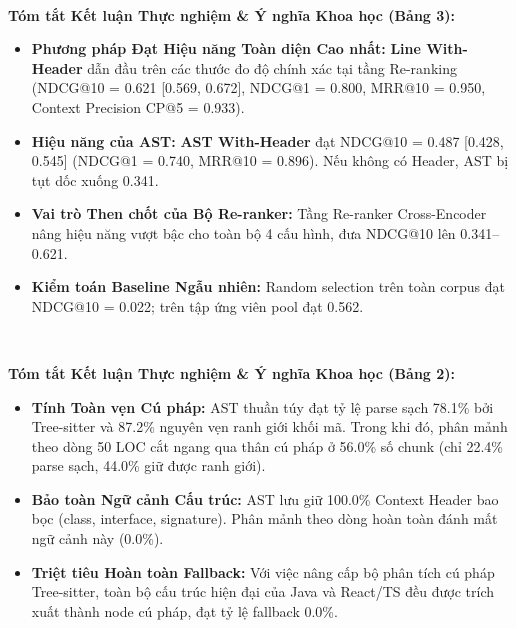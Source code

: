 \documentclass[11pt,a4paper,landscape]{article}
\begin{document}
\\[0.05cm]

\vspace{-0.1cm}
{\footnotesize
\noindent\textbf{Tóm tắt Kết luận Thực nghiệm \& Ý nghĩa Khoa học (Bảng 3):}
\begin{itemize}[nosep,topsep=1pt,partopsep=0pt,itemsep=1pt]
    \item \textbf{Phương pháp Đạt Hiệu năng Toàn diện Cao nhất:} \textbf{Line With-Header} dẫn đầu trên các thước đo độ chính xác tại tầng Re-ranking (NDCG@10 = 0.621 [0.569, 0.672], NDCG@1 = 0.800, MRR@10 = 0.950, Context Precision CP@5 = 0.933).
    \item \textbf{Hiệu năng của AST:} \textbf{AST With-Header} đạt NDCG@10 = 0.487 [0.428, 0.545] (NDCG@1 = 0.740, MRR@10 = 0.896). Nếu không có Header, AST bị tụt dốc xuống 0.341.
    \item \textbf{Vai trò Then chốt của Bộ Re-ranker:} Tầng Re-ranker Cross-Encoder nâng hiệu năng vượt bậc cho toàn bộ 4 cấu hình, đưa NDCG@10 lên 0.341--0.621.
    \item \textbf{Kiểm toán Baseline Ngẫu nhiên:} Random selection trên toàn corpus đạt NDCG@10 = 0.022; trên tập ứng viên pool đạt 0.562.
\end{itemize}
}
\clearpage

\\[0.05cm]

\vspace{-0.1cm}
{\small
\noindent\textbf{Tóm tắt Kết luận Thực nghiệm \& Ý nghĩa Khoa học (Bảng 2):}
\begin{itemize}[nosep,topsep=2pt,partopsep=0pt,itemsep=2pt]
    \item \textbf{Tính Toàn vẹn Cú pháp:} AST thuần túy đạt tỷ lệ parse sạch 78.1\% bởi Tree-sitter và 87.2\% nguyên vẹn ranh giới khối mã. Trong khi đó, phân mảnh theo dòng 50 LOC cắt ngang qua thân cú pháp ở 56.0\% số chunk (chỉ 22.4\% parse sạch, 44.0\% giữ được ranh giới).
    \item \textbf{Bảo toàn Ngữ cảnh Cấu trúc:} AST lưu giữ 100.0\% Context Header bao bọc (class, interface, signature). Phân mảnh theo dòng hoàn toàn đánh mất ngữ cảnh này (0.0\%).
    \item \textbf{Triệt tiêu Hoàn toàn Fallback:} Với việc nâng cấp bộ phân tích cú pháp Tree-sitter, toàn bộ cấu trúc hiện đại của Java và React/TS đều được trích xuất thành node cú pháp, đạt tỷ lệ fallback 0.0\%.
\end{itemize}
}
\end{document}
